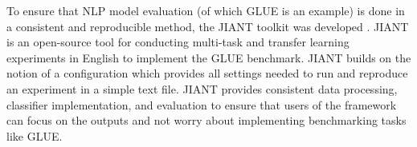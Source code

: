To ensure that NLP model evaluation (of which GLUE is an example) is done in a consistent and reproducible method, the JIANT toolkit was developed \cite{Pruksachatkun2020jiantAS}. JIANT is an open-source tool for conducting multi-task and transfer learning experiments in English to implement the GLUE benchmark. JIANT builds on the notion of a configuration which provides all settings needed to run and reproduce an experiment in a simple text file. JIANT provides consistent data processing, classifier implementation, and evaluation to ensure that users of the framework can focus on the outputs and not worry about implementing benchmarking tasks like GLUE.